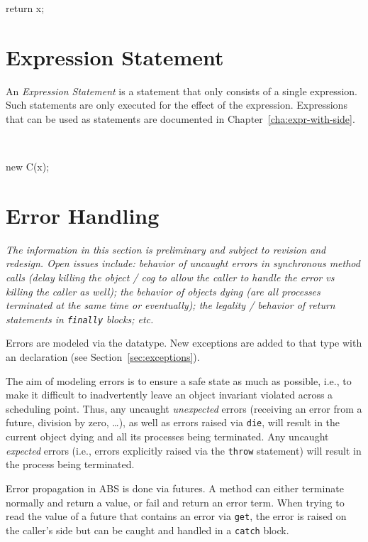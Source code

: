\begin{absexample}
return x;
\end{absexample}

\section{Expression Statement}
An \emph{Expression Statement} is a statement that only consists of a
single expression. Such statements are only executed for the effect of
the expression.  Expressions that can be used as statements are
documented in Chapter~\ref{cha:expr-with-side}.

\begin{abssyntax}
  {}\ \TRS{;}
\end{abssyntax}

\begin{absexample}
new C(x);
\end{absexample}

\section{Error Handling}
\label{sec:error-handling}

\emph{The information in this section is preliminary and subject to revision
  and redesign.  Open issues include: behavior of uncaught errors in
  synchronous method calls (delay killing the object / cog to allow the caller
  to handle the error vs killing the caller as well); the behavior of objects
  dying (are all processes terminated at the same time or eventually); the
  legality / behavior of return statements in \texttt{finally} blocks; etc.}

Errors are modeled via the  datatype.  New exceptions are
added to that type with an  declaration (see
Section~\ref{sec:exceptions}).

The aim of modeling errors is to ensure a safe state as much as possible,
i.e., to make it difficult to inadvertently leave an object invariant violated
across a scheduling point.  Thus, any uncaught \emph{unexpected} errors
(receiving an error from a future, division by zero, \dots), as well as errors
raised via \texttt{die}, will result in the current object dying and all its
processes being terminated.  Any uncaught \emph{expected} errors (i.e., errors
explicitly raised via the \texttt{throw} statement) will result in the process
being terminated.

Error propagation in ABS is done via futures.  A method can either
terminate normally and return a value, or fail and return an error term.
When trying to read the value of a future that contains an error via
\texttt{get}, the error is raised on the caller's side but can be caught
and handled in a \texttt{catch} block.


